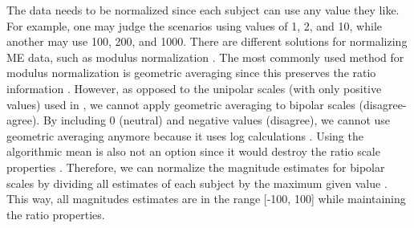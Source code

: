 %
The data needs to be normalized since each subject can use any value they like.
%
For example, one may judge the scenarios using values of 1, 2, and 10, while another may use 100, 200, and 1000.
%
There are different solutions for normalizing ME data, such as modulus normalization \citep{moskowitz1977magnitude}.
%
The most commonly used method for modulus normalization is geometric averaging since this preserves the ratio information \citep{moskowitz1977magnitude, mcgee2004master}.
%
However, as opposed to the unipolar scales (with only positive values) used in \citep{bard1996magnitude, mcgee2004master}, we cannot apply geometric averaging to bipolar scales (disagree-agree).
%
By including 0 (neutral) and negative values (disagree), we cannot use geometric averaging anymore because it uses log calculations \citep{moskowitz1977magnitude}.
%
Using the algorithmic mean is also not an option since it would destroy the ratio scale properties \citep{moskowitz1977magnitude}.
%
Therefore, we can normalize the magnitude estimates for bipolar scales by dividing all estimates of each subject by the maximum given value \citep{moskowitz1977magnitude}.
%
This way, all magnitudes estimates are in the range [-100, 100] while maintaining the ratio properties.
%

